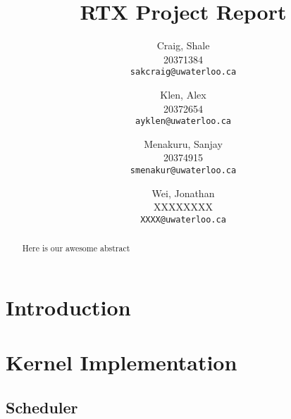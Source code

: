 \documentclass[12pt]{report}
\begin{document}

\title{RTX Project Report}

\author{
    Craig, Shale\\
    20371384\\
    \texttt{sakcraig@uwaterloo.ca}
    \and
    Klen, Alex\\
    20372654\\
    \texttt{ayklen@uwaterloo.ca}
    \and
    Menakuru, Sanjay\\
    20374915\\
    \texttt{smenakur@uwaterloo.ca}
    \and
    Wei, Jonathan\\
    XXXXXXXX\\
    \texttt{XXXX@uwaterloo.ca}
}

\maketitle

\begin{abstract}
    Here is our awesome abstract
\end{abstract}

\tableofcontents
\listofalgorithms
\listoffigures



\part{Introduction}

\part{Kernel Implementation}

\chapter{Scheduler}
\end{document}

